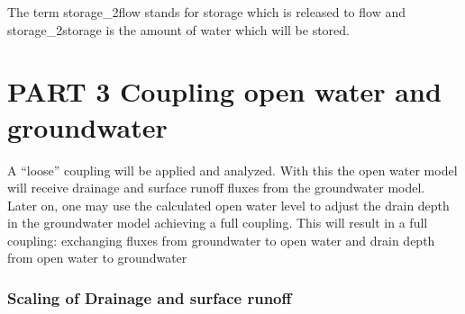 \documentclass[
]{article}
\begin{document}
The term storage\_2flow stands for storage which is released to flow and
storage\_2storage is the amount of water which will be stored.

\hypertarget{part-3-coupling-open-water-and-groundwater}{%
\section{PART 3 Coupling open water and
groundwater}\label{part-3-coupling-open-water-and-groundwater}}

A ``loose'' coupling will be applied and analyzed. With this the open
water model will receive drainage and surface runoff fluxes from the
groundwater model.\\
Later on, one may use the calculated open water level to adjust the
drain depth in the groundwater model achieving a full coupling. This
will result in a full coupling: exchanging fluxes from groundwater to
open water and drain depth from open water to groundwater

\hypertarget{scaling-of-drainage-and-surface-runoff}{%
\subsubsection{Scaling of Drainage and surface
runoff}\label{scaling-of-drainage-and-surface-runoff}}
\end{document}
